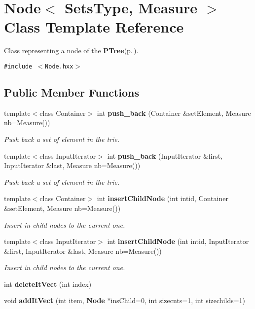 \section{Node$<$ Sets\-Type, Measure $>$ Class Template Reference}
\label{class_node}
Class representing a node of the {\bf PTree}{\rm (p.\,\pageref{class_p_tree})}.  


{\tt \#include $<$Node.hxx$>$}

\subsection*{Public Member Functions}
\begin{CompactItemize}
\item 
template$<$class Container$>$ int {\bf push\_\-back} (Container \&set\-Element, Measure nb=Measure())
\begin{CompactList}\small\item\em Push back a set of element in the trie. \item\end{CompactList}\item 
template$<$class Input\-Iterator$>$ int {\bf push\_\-back} (Input\-Iterator \&first, Input\-Iterator \&last, Measure nb=Measure())
\begin{CompactList}\small\item\em Push back a set of element in the trie. \item\end{CompactList}\item 
template$<$class Container$>$ int {\bf insert\-Child\-Node} (int intid, Container \&set\-Element, Measure nb=Measure())
\begin{CompactList}\small\item\em Insert in child nodes to the current one. \item\end{CompactList}\item 
template$<$class Input\-Iterator$>$ int {\bf insert\-Child\-Node} (int intid, Input\-Iterator \&first, Input\-Iterator \&last, Measure nb=Measure())
\begin{CompactList}\small\item\em Insert in child nodes to the current one. \item\end{CompactList}\item 
int {\bf delete\-It\-Vect} (int index)
\item 
void {\bf add\-It\-Vect} (int item, {\bf Node} $\ast$ins\-Child=0, int sizecnts=1, int sizechilds=1)

\end{CompactItemize}
